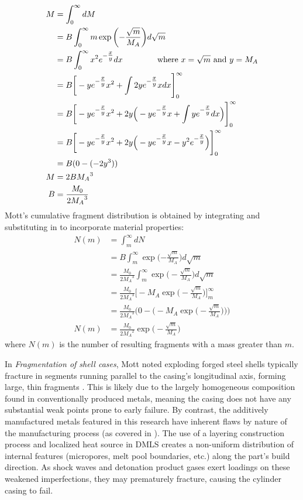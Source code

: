 \begin{align}
M &= \int_{0}^{\infty}dM \nonumber \\
 &= B\int_{0}^{\infty}m\exp\bigg({-\frac{\sqrt{m}}{M_{A}}}\bigg)d\sqrt{m}
\nonumber \\
 &= B\int_{0}^{\infty}x^{2}e^{-\tfrac{x}{y}}dx \text{\phantom{..............} where $x = \sqrt{m}$ and $y = M_{A}$} 
\nonumber \\ 
 &= B\bigg[-ye^{-\tfrac{x}{y}}x^2+\int{2y}e^{-\tfrac{x}{y}}xdx\Bigg]_{0}^\infty \nonumber \\
 &= B\bigg[-ye^{-\tfrac{x}{y}}x^2+{2y}\Big(-ye^{-\tfrac{x}{y}}x+\int{ye^{-\tfrac{x}{y}}}dx\Big)\Bigg]_{0}^\infty \nonumber \\
 &= B\bigg[-ye^{-\tfrac{x}{y}}x^2+{2y}\Big(-ye^{-\tfrac{x}{y}}x-{y^2e^{-\tfrac{x}{y}}}\Big)\Bigg]_{0}^\infty \nonumber \\
 &= B(0-(-2y^3)) \nonumber \\
M &= 2B{M_{A}}^3 \nonumber \\
B &= \frac{M_0}{2{M_{A}}^3}
\label{eq:2_Mott1934_B}  
\end{align}
%
Mott's cumulative fragment distribution is obtained by integrating  and substituting in  to incorporate material properties:
\begin{align}
N(m) &= \int_{m}^{\infty}dN \nonumber \\
 &= B\int_{m}^{\infty}\exp\bigg({-\frac{\sqrt{m}}{M_{A}}}\bigg)d\sqrt{m} \nonumber \\
&= \frac{M_0}{2{M_{A}}^3}\int_{m}^{\infty}\exp\bigg(-{\frac{\sqrt{m}}{M_{A}}}\bigg)d\sqrt{m}
\nonumber \\
&= \frac{M_0}{2{M_{A}}^3}\bigg[-M_{A}\exp\bigg(-\frac{\sqrt{m}}{M_{A}}\bigg) \bigg]_{m}^\infty  \nonumber \\
&= \frac{M_0}{2{M_{A}}^3}\bigg(0 - \bigg(-M_{A}\exp\bigg(-\frac{\sqrt{m}}{M_{A}}\bigg)\bigg) \bigg)  \nonumber \\
N(m) &= \frac{M_0}{2{M_{A}}^2}\exp\bigg(-\frac{\sqrt{m}}{M_{A}}\bigg)
\label{eq:2_Mott1934_Cumulative_frag}  
\end{align}
%
where $N(m)$ is the number of resulting fragments with a mass greater than $m$.

In \textit{Fragmentation of shell cases}, Mott noted exploding forged steel shells typically fracture in segments running parallel to the casing's longitudinal axis, forming large, thin fragments \cite{Mott1947}. This is likely due to the largely homogeneous composition found in conventionally produced metals, meaning the casing does not have any substantial weak points prone to early failure. By contrast, the additively manufactured metals featured in this research have inherent flaws by nature of the manufacturing process (as covered in ). The use of a layering construction process and localized heat source in \gls{DMLS} creates a non-uniform distribution of internal features (micropores, melt pool boundaries, etc.) along the part's build direction. As shock waves and detonation product gases exert loadings on these weakened imperfections, they may prematurely fracture, causing the cylinder casing to fail.

